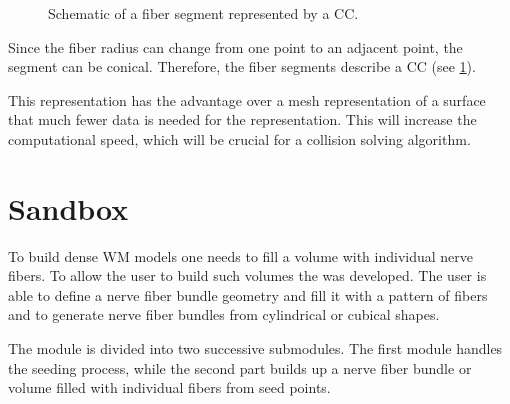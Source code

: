%
\begin{figure}[!t]
    \centering
    \setlength{\tikzwidth}{0.5\textwidth}
	\caption{Schematic of a fiber segment represented by a   \ac{CC}.}
	\label{fig:conical}
\end{figure}
%
Since the fiber radius can change from one point to an adjacent point, the segment can be conical.
Therefore, the fiber segments describe a \ac{CC} (see \cref{fig:conical}).
\par
%
This representation has the advantage over a mesh representation of a surface that much fewer data is needed for the representation.
This will increase the computational speed, which will be crucial for a collision solving algorithm.
%
% 
% 
\section{Sandbox}\label{sec:sandbox}
%
To build dense \ac{WM} models one needs to fill a volume with individual nerve fibers.
To allow the user to build such volumes the  was developed.
The user is able to define a nerve fiber bundle geometry and fill it with a pattern of fibers and to generate nerve fiber bundles from cylindrical or cubical shapes.
\par
%
The  module is divided into two successive submodules.
The first module handles the seeding process, while the second part builds up a nerve fiber bundle or volume filled with individual fibers from seed points.
%
% 
% 

